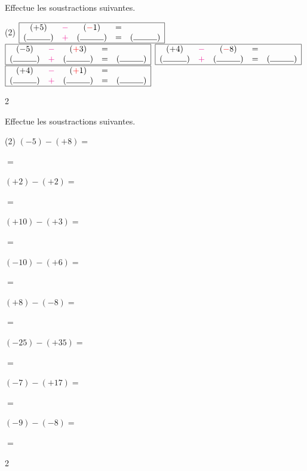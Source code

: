 \documentclass[a4paper,11pt]{report}
\begin{document}
\begin{exop}
{Effectue les soustractions suivantes.
\begin{tasks}(2)
\task $\begin{array}{|ccccc|}\hline
(+5)&{\color{magenta}-}&({\color{red}-}1)&= & \\
(\ligne{1})&{\color{magenta}+}&(\ligne{1})&=&(\ligne{1})\\\hline
\end{array}$ 
\task $\begin{array}{|ccccc|}\hline
(-5)&{\color{magenta}-}&({\color{red}+}3)&= & \\
(\ligne{1})&{\color{magenta}+}&(\ligne{1})&=&(\ligne{1})\\\hline
\end{array}$ 
\task $\begin{array}{|ccccc|}\hline
(+4)&{\color{magenta}-}&({\color{red}-}8)&= & \\
(\ligne{1})&{\color{magenta}+}&(\ligne{1})&=&(\ligne{1})\\\hline
\end{array}$ 
\task $\begin{array}{|ccccc|}\hline
(+4)&{\color{magenta}-}&({\color{red}+}1)&= & \\
(\ligne{1})&{\color{magenta}+}&(\ligne{1})&=&(\ligne{1})\\\hline
\end{array}$ 
\end{tasks}
}{2}
\end{exop}

\begin{exop}
{Effectue les soustractions suivantes.
\begin{tasks}(2)
\task $(-5)-(+8)=$

\bigskip{} $=$ 

\task $(+2)-(+2)=$

\bigskip{} $=$ 

\task $(+10)-(+3)=$

\bigskip{} $=$ 

\task $(-10)-(+6)=$

\bigskip{} $=$ 

\task $(+8)-(-8)=$

\bigskip{} $=$ 

\task $(-25)-(+35)=$

\bigskip{} $=$ 

\task $(-7)-(+17)=$

\bigskip{} $=$ 

\task $(-9)-(-8)=$

\bigskip{} $=$ 

\end{tasks}
}{2}
\end{exop}
\end{document}
